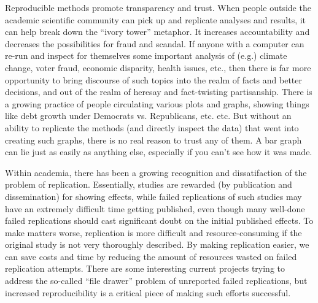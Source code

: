 \documentclass{book}
\begin{document}
Reproducible methods promote transparency and trust.  When people outside the academic scientific community can pick up and replicate analyses and results, it can help break down the ``ivory tower'' metaphor.  It increases accountability and decreases the possibilities for fraud and scandal. If anyone with a computer can re-run and inspect for themselves some important analysis of (e.g.) climate change, voter fraud, economic disparity, health issues, etc., then there is far more opportunity to bring discourse of such topics into the realm of facts and better decisions, and out of the realm of heresay and fact-twisting partisanship.  There is a growing practice of people circulating various plots and graphs, showing things like debt growth under Democrats vs. Republicans, etc. etc.  But without an ability to replicate the methods (and directly inspect the data) that went into creating such graphs, there is no real reason to trust any of them.  A bar graph can lie just as easily as anything else, especially if you can't see how it was made. 

Within academia, there has been a growing recognition and dissatifaction of the problem of replication. Essentially, studies are rewarded (by publication and dissemination) for showing effects, while failed replications of such studies may have an extremely difficult time getting published, even though many well-done failed replications should cast significant doubt on the initial published effects. To make matters worse, replication is more difficult and resource-consuming if the original study is not very thoroughly described. By making replication easier, we can save costs and time by reducing the amount of resources wasted on failed replication attempts. There are some interesting current projects trying to address the so-called ``file drawer'' problem of unreported failed replications, but increased reproducibility is a critical piece of making such efforts successful.
\end{document}
